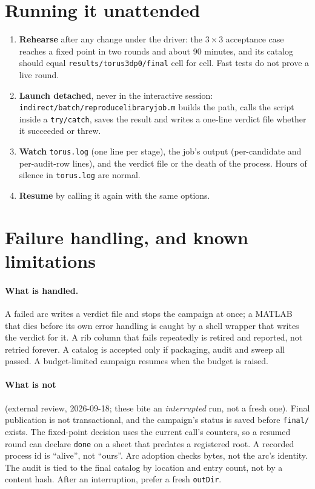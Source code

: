 \documentclass[11pt]{article}
\renewcommand{\_}{\textunderscore\allowbreak}
\newcommand{\code}[1]{\texttt{#1}}
\newcommand{\file}[1]{\texttt{\small #1}}
\begin{document}
\section{Running it unattended}

\begin{enumerate}[itemsep=2pt]
\item \textbf{Rehearse} after any change under the driver: the $3\times3$
  acceptance case reaches a fixed point in two rounds and about 90 minutes,
  and its catalog should equal \file{results/torus3d\_p0/final} cell for
  cell. Fast tests do not prove a live round.
\item \textbf{Launch detached}, never in the interactive session:
  \file{indirect/batch/reproduce\_library\_job.m} builds the path, calls the
  script inside a \code{try/catch}, saves the result and writes a one-line
  verdict file whether it succeeded or threw.
\item \textbf{Watch} \file{torus.log} (one line per stage), the job's output
  (per-candidate and per-audit-row lines), and the verdict file or the death
  of the process. Hours of silence in \file{torus.log} are normal.
\item \textbf{Resume} by calling it again with the same options.
\end{enumerate}

\section{Failure handling, and known limitations}

\paragraph{What is handled.} A failed arc writes a verdict file and stops
the campaign at once; a MATLAB that dies before its own error handling is
caught by a shell wrapper that writes the verdict for it. A rib column that
fails repeatedly is retired and reported, not retried forever. A catalog is
accepted only if packaging, audit and sweep all passed. A budget-limited
campaign resumes when the budget is raised.

\paragraph{What is not} (external review, 2026-09-18; these bite an
\emph{interrupted} run, not a fresh one). Final publication is not
transactional, and the campaign's status is saved before \file{final/}
exists. The fixed-point decision uses the current call's counters, so a
resumed round can declare \code{done} on a sheet that predates a registered
root. A recorded process id is ``alive'', not ``ours''. Arc adoption checks
bytes, not the arc's identity. The audit is tied to the final catalog by
location and entry count, not by a content hash. After an interruption,
prefer a fresh \code{outDir}.
\end{document}
